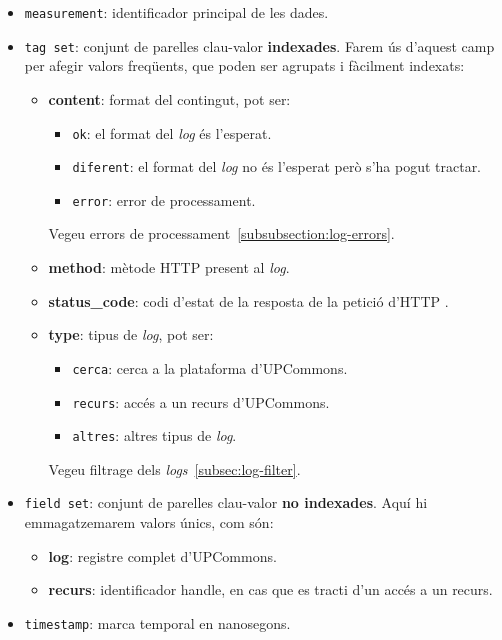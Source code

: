 \begin{itemize}
    \item \texttt{measurement}: identificador principal de les dades.
    \item \texttt{tag set}: conjunt de parelles clau-valor \textbf{indexades}.
    Farem ús d'aquest camp per afegir valors freqüents, que poden ser agrupats i fàcilment indexats:
    \begin{itemize}
        \item \textbf{content}: format del contingut, pot ser:
        \begin{itemize}
            \item \texttt{ok}: el format del \textit{\gls{log}} és l'esperat.
            \item \texttt{diferent}: el format del \textit{\gls{log}} no és l'esperat però s'ha pogut tractar.
            \item \texttt{error}: error de processament.
        \end{itemize}
        Vegeu errors de processament~\ref{subsubsection:log-errors}.
        \item \textbf{method}: mètode \gls{HTTP} present al \textit{\gls{log}}.
        \item \textbf{status\_code}: codi d'estat de la resposta de la petició d'\gls{HTTP} .
        \item \textbf{type}: tipus de \textit{\gls{log}}, pot ser:
        \begin{itemize}
            \item \texttt{cerca}: cerca a la plataforma d'\gls{UPCommons}.
            \item \texttt{recurs}: accés a un recurs d'\gls{UPCommons}.
            \item \texttt{altres}: altres tipus de \textit{\gls{log}}.
        \end{itemize}
        Vegeu filtrage dels \textit{\gls{log}s}~\ref{subsec:log-filter}.
    \end{itemize}
    \item \texttt{field set}: conjunt de parelles clau-valor \textbf{no indexades}.
    Aquí hi emmagatzemarem valors únics, com són:
    \begin{itemize}
        \item \textbf{log}: registre complet d'\gls{UPCommons}.
        \item \textbf{recurs}: identificador \gls{handle}, en cas que es tracti d'un accés a un recurs.
    \end{itemize}
    \item \texttt{\gls{timestamp}}: marca temporal en nanosegons.
\end{itemize}

